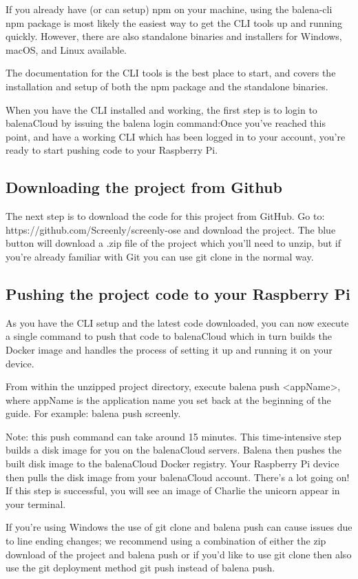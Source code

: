 If you already have (or can setup) npm on your machine, using the balena-cli npm package is most likely the easiest way to get the CLI tools up and running quickly. However, there are also standalone binaries and installers for Windows, macOS, and Linux available.

The documentation for the CLI tools is the best place to start, and covers the installation and setup of both the npm package and the standalone binaries.

When you have the CLI installed and working, the first step is to login to balenaCloud by issuing the balena login command:Once you’ve reached this point, and have a working CLI which has been logged in to your account, you're ready to start pushing code to your Raspberry Pi.
\subsection*{Downloading the project from Github}

The next step is to download the code for this project from GitHub. Go to: https://github.com/Screenly/screenly-ose and download the project.
The blue button will download a .zip file of the project which you'll need to unzip, but if you're already familiar with Git you can use git clone in the normal way.
\subsection*{Pushing the project code to your Raspberry Pi}

As you have the CLI setup and the latest code downloaded, you can now execute a single command to push that code to balenaCloud which in turn builds the Docker image and handles the process of setting it up and running it on your device.

From within the unzipped project directory, execute balena push <appName>, where appName is the application name you set back at the beginning of the guide. For example: balena push screenly.

Note: this push command can take around 15 minutes. This time-intensive step builds a disk image for you on the balenaCloud servers. Balena then pushes the built disk image to the balenaCloud Docker registry. Your Raspberry Pi device then pulls the disk image from your balenaCloud account. There’s a lot going on! If this step is successful, you will see an image of Charlie the unicorn appear in your terminal.

If you're using Windows the use of git clone and balena push can cause issues due to line ending changes; we recommend using a combination of either the zip download of the project and balena push or if you'd like to use git clone then also use the git deployment method git push instead of balena push.

